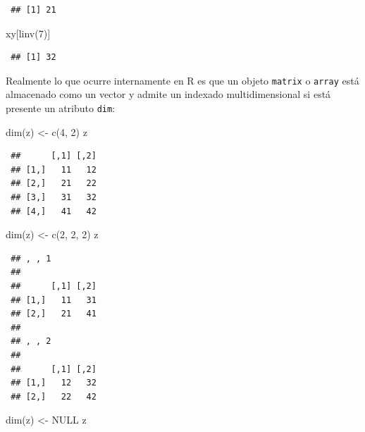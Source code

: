 \documentclass[
]{book}
\newenvironment{Shaded}{\begin{snugshade}}{\end{snugshade}}
\newcommand{\ConstantTok}[1]{\textcolor[rgb]{0.00,0.00,0.00}{#1}}
\newcommand{\DecValTok}[1]{\textcolor[rgb]{0.00,0.00,0.81}{#1}}
\newcommand{\FunctionTok}[1]{\textcolor[rgb]{0.00,0.00,0.00}{#1}}
\newcommand{\NormalTok}[1]{#1}
\newcommand{\OtherTok}[1]{\textcolor[rgb]{0.56,0.35,0.01}{#1}}
\theoremstyle{break}
\theoremstyle{nonumberplain}
\begin{document}
\begin{verbatim}
 ## [1] 21
\end{verbatim}

\begin{Shaded}
\begin{Highlighting}[]
\NormalTok{xy[}\FunctionTok{linv}\NormalTok{(}\DecValTok{7}\NormalTok{)]}
\end{Highlighting}
\end{Shaded}

\begin{verbatim}
 ## [1] 32
\end{verbatim}

Realmente lo que ocurre internamente en R es que un objeto \texttt{matrix} o \texttt{array} está almacenado como un vector y admite un indexado multidimensional si está presente un atributo \texttt{dim}:

\begin{Shaded}
\begin{Highlighting}[]
\FunctionTok{dim}\NormalTok{(z) }\OtherTok{\textless{}{-}} \FunctionTok{c}\NormalTok{(}\DecValTok{4}\NormalTok{, }\DecValTok{2}\NormalTok{)}
\NormalTok{z}
\end{Highlighting}
\end{Shaded}

\begin{verbatim}
 ##      [,1] [,2]
 ## [1,]   11   12
 ## [2,]   21   22
 ## [3,]   31   32
 ## [4,]   41   42
\end{verbatim}

\begin{Shaded}
\begin{Highlighting}[]
\FunctionTok{dim}\NormalTok{(z) }\OtherTok{\textless{}{-}} \FunctionTok{c}\NormalTok{(}\DecValTok{2}\NormalTok{, }\DecValTok{2}\NormalTok{, }\DecValTok{2}\NormalTok{)}
\NormalTok{z}
\end{Highlighting}
\end{Shaded}

\begin{verbatim}
 ## , , 1
 ## 
 ##      [,1] [,2]
 ## [1,]   11   31
 ## [2,]   21   41
 ## 
 ## , , 2
 ## 
 ##      [,1] [,2]
 ## [1,]   12   32
 ## [2,]   22   42
\end{verbatim}

\begin{Shaded}
\begin{Highlighting}[]
\FunctionTok{dim}\NormalTok{(z) }\OtherTok{\textless{}{-}} \ConstantTok{NULL}
\NormalTok{z}
\end{Highlighting}
\end{Shaded}
\end{document}
